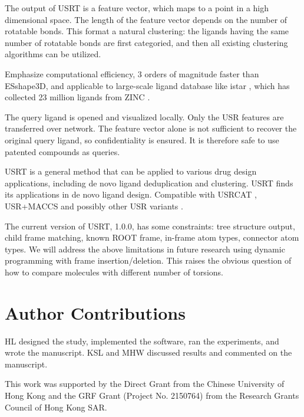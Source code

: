 \documentclass[twocolumn]{svjour3}          %
\begin{document}
The output of USRT is a feature vector, which maps to a point in a high dimensional space. The length of the feature vector depends on the number of rotatable bonds. This format a natural clustering: the ligands having the same number of rotatable bonds are first categoried, and then all existing clustering algorithms can be utilized.

Emphasize computational efficiency, 3 orders of magnitude faster than ESshape3D, and applicable to large-scale ligand database like istar \cite{1362}, which has collected 23 million ligands from ZINC \cite{532,1178}.

The query ligand is opened and visualized locally. Only the USR features are transferred over network. The feature vector alone is not sufficient to recover the original query ligand, so confidentiality is ensured. It is therefore safe to use patented compounds as queries.

USRT is a general method that can be applied to various drug design applications, including de novo ligand deduplication and clustering. USRT finds its applications in de novo ligand design. Compatible with USRCAT \cite{1331}, USR+MACCS \cite{1333} and possibly other USR variants \cite{1334}.

The current version of USRT, 1.0.0, has some constraints: tree structure output, child frame matching, known ROOT frame, in-frame atom types, connector atom types. We will address the above limitations in future research using dynamic programming with frame insertion/deletion. This raises the obvious question of how to compare molecules with different number of torsions.

\section{Author Contributions}

HL designed the study, implemented the software, ran the experiments, and wrote the manuscript. KSL and MHW discussed results and commented on the manuscript.

\begin{acknowledgements}

This work was supported by the Direct Grant from the Chinese University of Hong Kong and the GRF Grant (Project No. 2150764) from the Research Grants Council of Hong Kong SAR.

\end{acknowledgements}

\end{document}
